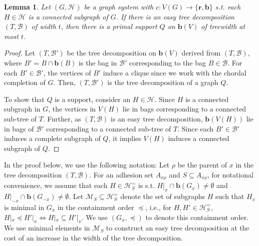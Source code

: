 \documentclass[12pt]{article}
\newcommand{\BB}{\mathcal{B}}
\newcommand{\R}{\mathbf{r}}
\newcommand{\B}{\mathbf{b}}
\newcommand{\HH}{\mathcal{H}}
\newtheorem{lemma}[theorem]{Lemma}
\theoremstyle{case}
\begin{document}
\begin{lemma}
\label{lem:easytd}
Let $(G,\mathcal{H})$ be a graph system with $c:V(G)\to\{\R,\B\}$
s.t. each $H\in\mathcal{H}$ is a connected subgraph
of $G$.
If there is an easy tree decomposition $(T,\mathcal{B})$ of
width $t$, then there is a primal support $Q$ 
on $\B(V)$ of treewidth at most $t$.
\end{lemma}
\begin{proof}
Let $(T,\mathcal{B}')$ be the tree decomposition on $\B(V)$
derived from $(T,\mathcal{B})$, 
where $B'=B\cap\B(B)$ is the bag in $\mathcal{B}'$ corresponding to
the bag $B\in\mathcal{B}$. 
For each $B'\in\mathcal{B}'$,
the vertices of $B'$ induce a clique since we work with the
chordal completion of $G$.
Then, $(T,\mathcal{B}')$ is the
tree decomposition of a graph $Q$.  

To show that $Q$ is a support, consider an $H\in\mathcal{H}$.
Since $H$ is a connected subgraph in $G$, 
the vertices in $V(H)$ lie in bags corresponding to 
a connected sub-tree of $T$.
Further, as $(T,\mathcal{B})$ is an 
easy tree decomposition, $\B(V(H))$ lie in bags
of $\mathcal{B}'$ corresponding to a connected sub-tree of $T$.
Since each $B'\in\mathcal{B}'$ induces a complete subgraph
of $Q$, it implies $V(H)$ induces a connected subgraph of $Q$.
\end{proof}

In the proof below, we use the following
notation:
Let $\rho$ be the parent of $x$ in the tree decomposition $(T,\BB)$.
For an adhesion set $A_{x\rho}$ and $S\subseteq A_{x\rho}$, 
for notational convenience,
we assume that each $H\in\mathcal{H}^=_S$ is s.t. 
$H|_x\cap\B(G_x)\neq\emptyset$ and $H|_{-x}\cap\B(G_{-x})\neq\emptyset$.
Let
$\mathcal{M}_S\subseteq\mathcal{H}^=_S$ denote
the set of subgraphs $H$ such that $H_x$ is minimal in $G_x$ in the containment order $\preceq$, i.e., for $H,H'\in\HH^=_S$, 
$H|_x\preceq H'|_x \Leftrightarrow H|_x\subseteq H'|_x$.
We use $(G_x,\preceq)$ to denote this containment order.
We use minimal elements in $\mathcal{M}_S$ to construct an easy tree decomposition at the cost of an increase in the width of the tree decomposition.
\end{document}
